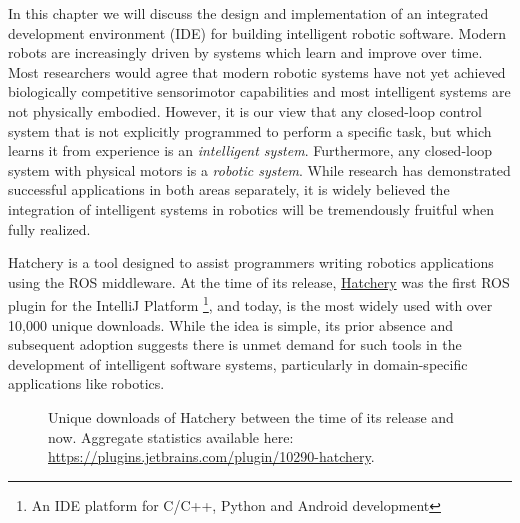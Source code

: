 \documentclass[12pt,initial,twoside,maitrise]{dms}
\numberwithin{equation}{section}
\numberwithin{table}{chapter}
\numberwithin{figure}{chapter}
\begin{document}
In this chapter we will discuss the design and implementation of an integrated development environment (IDE) for building intelligent robotic software. Modern robots are increasingly driven by systems which learn and improve over time. Most researchers would agree that modern robotic systems have not yet achieved biologically competitive sensorimotor capabilities and most intelligent systems are not physically embodied. However, it is our view that any closed-loop control system that is not explicitly programmed to perform a specific task, but which learns it from experience is an \textit{intelligent system}. Furthermore, any closed-loop system with physical motors is a \textit{robotic system}. While research has demonstrated successful applications in both areas separately, it is widely believed the integration of intelligent systems in robotics will be tremendously fruitful when fully realized.

Hatchery is a tool designed to assist programmers writing robotics applications using the ROS middleware. At the time of its release, \href{https://github.com/duckietown/hatchery}{Hatchery} was the first ROS plugin for the IntelliJ Platform \footnote{An IDE platform for C/C++, Python and Android development}, and today, is the most widely used with over 10,000 unique downloads. While the idea is simple, its prior absence and subsequent adoption suggests there is unmet demand for such tools in the development of intelligent software systems, particularly in domain-specific applications like robotics.
%

\begin{figure}
\centering
{}
\caption{Unique downloads of Hatchery between the time of its release and now. Aggregate statistics available here: \url{https://plugins.jetbrains.com/plugin/10290-hatchery}.}
\label{fig:hatchery_downloads}
\end{figure}
%
\end{document}
